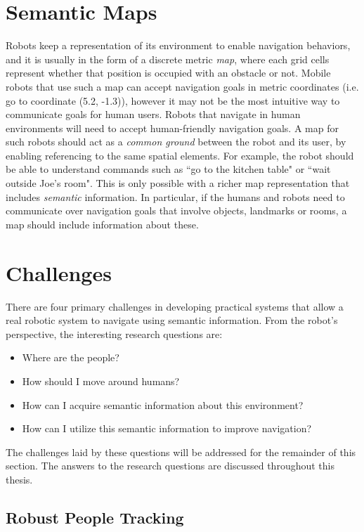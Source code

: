 \section{Semantic Maps}
\label{sec:semantic_maps}

Robots keep a representation of its environment to enable navigation behaviors, and it is usually in the form of a discrete metric \textit{map}, where each grid cells represent whether that position is occupied with an obstacle or not. Mobile robots that use such a map can accept navigation goals in metric coordinates (i.e. go to coordinate (5.2, -1.3)), however it may not be the most intuitive way to communicate goals for human users. Robots that navigate in human environments will need to accept human-friendly navigation goals. A map for such robots should act as a \textit{common ground} between the robot and its user, by enabling referencing to the same spatial elements. For example, the robot should be able to understand commands such as ``go to the kitchen table" or ``wait outside Joe's room". This is only possible with a richer map representation that includes \textit{semantic} information. In particular, if the humans and robots need to communicate over navigation goals that involve objects, landmarks or rooms, a map should include information about these.

\section{Challenges}

There are four primary challenges in developing practical systems that allow a real robotic system to navigate using semantic information. From the robot's perspective, the interesting research questions are:

\begin{itemize}
\item Where are the people?
\item How should I move around humans?
\item How can I acquire semantic information about this environment?
\item How can I utilize this semantic information to improve navigation?
\end{itemize}

The challenges laid by these questions will be addressed for the remainder of this section. The answers to the research questions are discussed throughout this thesis.

\subsection{Robust People Tracking}

